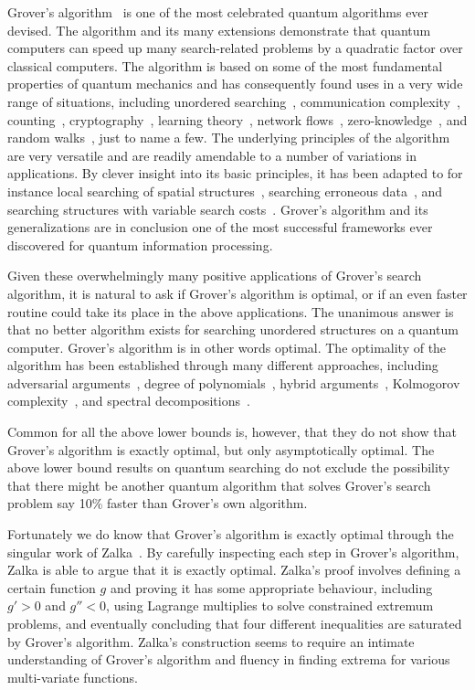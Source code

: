 \documentclass{article}
\begin{document}
Grover's algorithm~\cite{grover1} is one of the most celebrated
quantum algorithms ever devised.  The algorithm and its many
extensions demonstrate that quantum computers can speed up many
search-related problems by a quadratic factor over classical
computers.  The algorithm is based on some of the most fundamental
properties of quantum mechanics and has consequently found uses in a
very wide range of situations, including
unordered searching~\cite{grover1,bbht}, 
communication complexity~\cite{buhrman},
counting~\cite{hoyeramp}, 
cryptography~\cite{ad},
learning theory~\cite{ser}, 
network flows~\cite{ambm},
zero-knowledge~\cite{wat}, and
random walks~\cite{nayak},
just to name a few.  The underlying principles of the algorithm are
very versatile and are readily amendable to a number of variations in
applications.  By clever insight into its basic principles, it has
been adapted to for instance local searching of spatial
structures~\cite{aar}, searching erroneous data~\cite{hoyerberror},
and searching structures with variable search costs~\cite{ambvar}.
Grover's algorithm and its generalizations are in conclusion one of
the most successful frameworks ever discovered for quantum information
processing.

Given these overwhelmingly many positive applications of Grover's
search algorithm, it is natural to ask if Grover's algorithm is
optimal, or if an even faster routine could take its place in the
above applications.  The unanimous answer is that no better algorithm
exists for searching unordered structures on a quantum computer.
Grover's algorithm is in other words optimal.  The optimality of the
algorithm has been established through many different approaches,
including
adversarial arguments~\cite{amb},
degree of polynomials~\cite{beals},
hybrid arguments~\cite{bbbv},
Kolmogorov complexity~\cite{laplante}, and
spectral decompositions~\cite{barnum}.

Common for all the above lower bounds is, however, that they do not
show that Grover's algorithm is exactly optimal, but only
asymptotically optimal.  The above lower bound results on quantum
searching do not exclude the possibility that there might be another
quantum algorithm that solves Grover's search problem say 10\% faster
than Grover's own algorithm.

Fortunately we do know that Grover's algorithm is exactly optimal
through the singular work of Zalka~\cite{zalka}.  By carefully
inspecting each step in Grover's algorithm, Zalka is able to argue
that it is exactly optimal.  Zalka's proof involves defining a certain
function $g$ and proving it has some appropriate behaviour, including
$g'>0$ and $g''<0$, using Lagrange multiplies to solve constrained
extremum problems, and eventually concluding
that four different inequalities are saturated by Grover's algorithm.
Zalka's construction seems to require an intimate understanding
of Grover's algorithm and fluency in finding extrema for various
multi-variate functions.  
\end{document}
